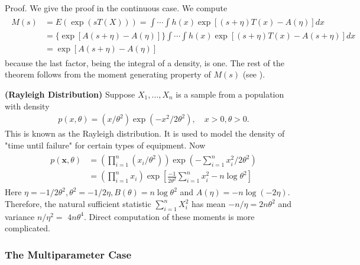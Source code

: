 \documentclass{article}
\newcommand{\bfs}[1]{\textbf{({#1}) }}
\begin{document}
Proof. We give the proof in the continuous case. We compute
\begin{align*}
\begin{aligned}
M(s) &=E(\exp (s T(X)))=\int \cdots \int h(x) \exp [(s+\eta) T(x)-A(\eta)] d x \\
&=\{\exp [A(s+\eta)-A(\eta)]\} \int \cdots \int h(x) \exp [(s+\eta) T(x)-A(s+\eta)] d x \\
&=\exp [A(s+\eta)-A(\eta)]
\end{aligned}
\end{align*}
because the last factor, being the integral of a density, is one. The rest of the theorem follows from the moment generating property of $M(s)$ (see \cite[Section A.12]{Statistics}).
\begin{exma}\bfs{Rayleigh Distribution}
Suppose $X_{1}, \ldots, X_{n}$ is a sample from a population with density
\begin{align*}
p(x, \theta)=\left(x / \theta^{2}\right) \exp \left(-x^{2} / 2 \theta^{2}\right), \quad x>0, \theta>0 .
\end{align*}
This is known as the Rayleigh distribution. It is used to model the density of "time until failure" for certain types of equipment. Now
\begin{align*}
\begin{aligned}
p(\mathbf{x}, \theta) &=\left(\prod_{i=1}^{n}\left(x_{i} / \theta^{2}\right)\right) \exp \left(-\sum_{i=1}^{n} x_{i}^{2} / 2 \theta^{2}\right) \\
&=\left(\prod_{i=1}^{n} x_{i}\right) \exp \left[\frac{-1}{2 \theta^{2}} \sum_{i=1}^{n} x_{i}^{2}-n \log \theta^{2}\right]
\end{aligned}
\end{align*}
Here $\eta=-1 / 2 \theta^{2}, \theta^{2}=-1 / 2 \eta, B(\theta)=n \log \theta^{2}$ and $A(\eta)=-n \log (-2 \eta)$. Therefore, the natural sufficient statistic $\sum_{i=1}^{n} X_{i}^{2}$ has mean $-n / \eta=2 n \theta^{2}$ and variance $n / \eta^{2}=$ $4 n \theta^{4}$. Direct computation of these moments is more complicated.
\end{exma}

\subsubsection{The Multiparameter Case}
\end{document}

